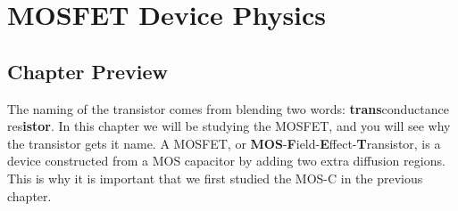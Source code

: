 \chapter{MOSFET Device Physics}
\label{ch:ch08_mos}
\graphicspath{{./figures/figs_ch08_mos/}}
\section{Chapter Preview}
The naming of the transistor comes from blending two words: \textbf{trans}conductance res\textbf{istor}.  In this chapter we will be studying the MOSFET, and you will see why the transistor gets it name.  A MOSFET, or \textbf{MOS}-\textbf{F}ield-\textbf{E}ffect-\textbf{T}ransistor, is a device constructed from a MOS capacitor by adding two extra diffusion regions.  This is why it is important that we first studied the MOS-C in the previous chapter.

